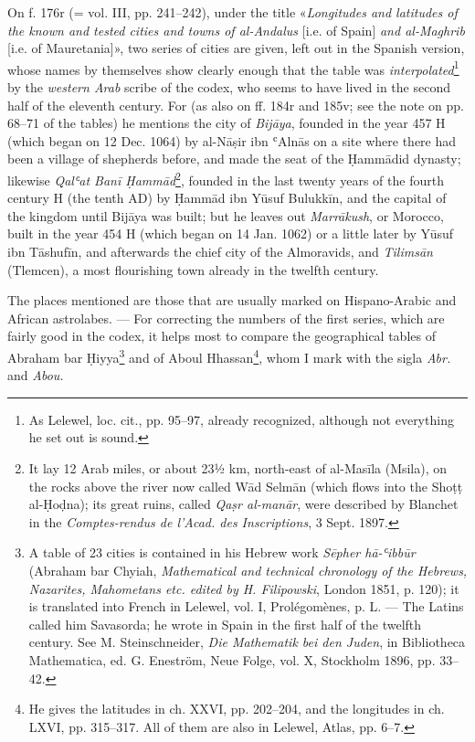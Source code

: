 \documentclass[11pt]{article}
\begin{document}
\par On f. 176r (= vol. III, pp. 241–242), under the title «\emph{Longitudes and latitudes of the known and tested cities and towns of al-Andalus} [i.e. of Spain] \emph{and al-Maghrib} [i.e. of Mauretania]», two series of cities are given, left out in the Spanish version, whose names by themselves show clearly enough that the table was \emph{interpolated}\footnote{As Lelewel, loc. cit., pp. 95–97, already recognized, although not everything he set out is sound.} by the \emph{western Arab} scribe of the codex, who seems to have lived in the second half of the eleventh century. For (as also on ff. 184r and 185v; see the note on pp. 68–71 of the tables) he mentions the city of \emph{Bijāya}, founded in the year 457 H (which began on 12 Dec. 1064) by al-Nāṣir ibn ʿAlnās on a site where there had been a village of shepherds before, and made the seat of the Ḥammādid dynasty; likewise \emph{Qalʿat Banī Ḥammād}\footnote{It lay 12 Arab miles, or about 23½ km, north-east of al-Masīla (Msila), on the rocks above the river now called Wād Selmān (which flows into the Shoṭṭ al-Ḥoḍna); its great ruins, called \emph{Qaṣr al-manār}, were described by Blanchet in the \emph{Comptes-rendus de l'Acad. des Inscriptions}, 3 Sept. 1897.}, founded in the last twenty years of the fourth century H (the tenth AD) by Ḥammād ibn Yūsuf Bulukkīn, and the capital of the kingdom until Bijāya was built; but he leaves out \emph{Marrākush}, or Morocco, built in the year 454 H (which began on 14 Jan. 1062) or a little later by Yūsuf ibn Tāshufīn, and afterwards the chief city of the Almoravids, and \emph{Tilimsān} (Tlemcen), a most flourishing town already in the twelfth century.\par
\par The places mentioned are those that are usually marked on Hispano-Arabic and African astrolabes. — For correcting the numbers of the first series, which are fairly good in the codex, it helps most to compare the geographical tables of Abraham bar Ḥiyya\footnote{A table of 23 cities is contained in his Hebrew work \emph{Sēpher hā-ʿibbūr} (Abraham bar Chyiah, \emph{Mathematical and technical chronology of the Hebrews, Nazarites, Mahometans etc. edited by H. Filipowski}, London 1851, p. 120); it is translated into French in Lelewel, vol. I, Prolégomènes, p. L. — The Latins called him Savasorda; he wrote in Spain in the first half of the twelfth century. See M. Steinschneider, \emph{Die Mathematik bei den Juden}, in Bibliotheca Mathematica, ed. G. Eneström, Neue Folge, vol. X, Stockholm 1896, pp. 33–42.} and of Aboul Hhassan\footnote{He gives the latitudes in ch. XXVI, pp. 202–204, and the longitudes in ch. LXVI, pp. 315–317. All of them are also in Lelewel, Atlas, pp. 6–7.}, whom I mark with the sigla \emph{Abr.} and \emph{Abou.}\par
\end{document}
